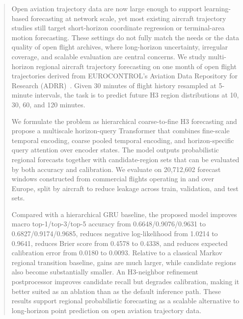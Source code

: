 \begin{abstract}
Open aviation trajectory data are now large enough to support learning-based forecasting at network scale, yet most existing aircraft trajectory studies still target short-horizon coordinate regression or terminal-area motion forecasting. These settings do not fully match the needs or the data quality of open flight archives, where long-horizon uncertainty, irregular coverage, and scalable evaluation are central concerns. We study multi-horizon regional aircraft trajectory forecasting on one month of open flight trajectories derived from EUROCONTROL's Aviation Data Repository for Research (ADRR)~\cite{eurocontrol_adrr_2025}. Given 30 minutes of flight history resampled at 5-minute intervals, the task is to predict future H3 region distributions at 10, 30, 60, and 120 minutes.

We formulate the problem as hierarchical coarse-to-fine H3 forecasting and propose a multiscale horizon-query Transformer that combines fine-scale temporal encoding, coarse pooled temporal encoding, and horizon-specific query attention over encoder states. The model outputs probabilistic regional forecasts together with candidate-region sets that can be evaluated by both accuracy and calibration. We evaluate on 20,712,602 forecast windows constructed from commercial flights operating in and over Europe, split by aircraft to reduce leakage across train, validation, and test sets.

Compared with a hierarchical GRU baseline, the proposed model improves macro top-1/top-3/top-5 accuracy from 0.6648/0.9076/0.9631 to 0.6827/0.9174/0.9685, reduces negative log-likelihood from 1.0214 to 0.9641, reduces Brier score from 0.4578 to 0.4338, and reduces expected calibration error from 0.0180 to 0.0093. Relative to a classical Markov regional transition baseline, gains are much larger, while candidate regions also become substantially smaller. An H3-neighbor refinement postprocessor improves candidate recall but degrades calibration, making it better suited as an ablation than as the default inference path. These results support regional probabilistic forecasting as a scalable alternative to long-horizon point prediction on open aviation trajectory data.
\end{abstract}
